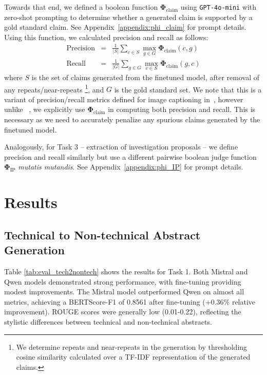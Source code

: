 \documentclass[11pt]{article}
\begin{document}
Towards that end, we defined a boolean function $\mathbf{\Phi}_{\textrm{claim}}$ using \texttt{GPT-4o-mini} with zero-shot prompting to determine whether a generated claim is supported by a gold standard claim. See Appendix~\ref{appendix:phi_claim} for prompt details. Using this function, we calculated precision and recall as follows:
\begin{equation*}
\left.\begin{aligned}
\text{Precision}&=&\frac{1}{|S|} \sum_{c \in S} \max_{g \in G} \mathbf{\Phi}_{\textrm{claim}}(c, g)\\
\text{Recall}&=&\frac{1}{|G|} \sum_{g \in G} \max_{c \in S} \mathbf{\Phi}_{\textrm{claim}}(g, c)
\end{aligned}\right.
\end{equation*}
\noindent where $S$ is the set of claims generated from the finetuned model, after removal of any repeats/near-repeats
\footnote{We determine repeats and near-repeats in the generation by thresholding cosine similarity calculated over a TF-IDF representation of the generated claims.},
 and $G$ is the gold standard set. We note that this is a variant of precision/recall metrics defined for image captioning in~\cite{deitke2024molmo}, however unlike ~\citeauthor{deitke2024molmo}, we explicitly use $\mathbf{\Phi}_{\textrm{claim}}$ in computing both precision and recall. This is necessary as we need to accurately penalize any spurious claims generated by the finetuned model.

Analogously, for Task 3 -- extraction of investigation proposals -- we define precision and recall similarly but use a different pairwise boolean judge function $\mathbf{\Phi}_{\textrm{IP}}$ \textit{mutatis mutandis}. See Appendix~\ref{appendix:phi_IP} for prompt details.


\section{Results}

\subsection{Technical to Non-technical Abstract Generation}
Table \ref{tab:eval_tech2nontech} shows the results for Task 1. Both Mistral and Qwen models demonstrated strong performance, with fine-tuning providing modest improvements. The Mistral model outperformed Qwen on almost all metrics, achieving a BERTScore-F1 of 0.8561 after fine-tuning (+0.36\% relative improvement). ROUGE scores were generally low (0.01-0.22), reflecting the stylistic differences between technical and non-technical abstracts.
\end{document}
